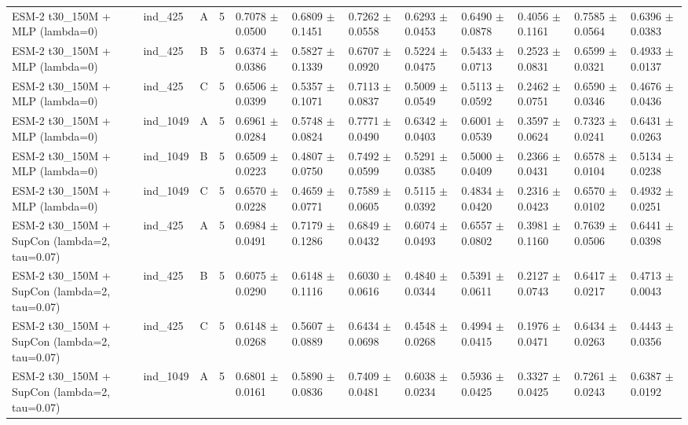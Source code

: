 \begin{table}[ht]
\begin{tabular}{llllllllllll}
ESM-2 t30\_150M + MLP (lambda=0) & ind\_425 & A & 5 & 0.7078 $\pm$ 0.0500 & 0.6809 $\pm$ 0.1451 & 0.7262 $\pm$ 0.0558 & 0.6293 $\pm$ 0.0453 & 0.6490 $\pm$ 0.0878 & 0.4056 $\pm$ 0.1161 & 0.7585 $\pm$ 0.0564 & 0.6396 $\pm$ 0.0383 \\
ESM-2 t30\_150M + MLP (lambda=0) & ind\_425 & B & 5 & 0.6374 $\pm$ 0.0386 & 0.5827 $\pm$ 0.1339 & 0.6707 $\pm$ 0.0920 & 0.5224 $\pm$ 0.0475 & 0.5433 $\pm$ 0.0713 & 0.2523 $\pm$ 0.0831 & 0.6599 $\pm$ 0.0321 & 0.4933 $\pm$ 0.0137 \\
ESM-2 t30\_150M + MLP (lambda=0) & ind\_425 & C & 5 & 0.6506 $\pm$ 0.0399 & 0.5357 $\pm$ 0.1071 & 0.7113 $\pm$ 0.0837 & 0.5009 $\pm$ 0.0549 & 0.5113 $\pm$ 0.0592 & 0.2462 $\pm$ 0.0751 & 0.6590 $\pm$ 0.0346 & 0.4676 $\pm$ 0.0436 \\
ESM-2 t30\_150M + MLP (lambda=0) & ind\_1049 & A & 5 & 0.6961 $\pm$ 0.0284 & 0.5748 $\pm$ 0.0824 & 0.7771 $\pm$ 0.0490 & 0.6342 $\pm$ 0.0403 & 0.6001 $\pm$ 0.0539 & 0.3597 $\pm$ 0.0624 & 0.7323 $\pm$ 0.0241 & 0.6431 $\pm$ 0.0263 \\
ESM-2 t30\_150M + MLP (lambda=0) & ind\_1049 & B & 5 & 0.6509 $\pm$ 0.0223 & 0.4807 $\pm$ 0.0750 & 0.7492 $\pm$ 0.0599 & 0.5291 $\pm$ 0.0385 & 0.5000 $\pm$ 0.0409 & 0.2366 $\pm$ 0.0431 & 0.6578 $\pm$ 0.0104 & 0.5134 $\pm$ 0.0238 \\
ESM-2 t30\_150M + MLP (lambda=0) & ind\_1049 & C & 5 & 0.6570 $\pm$ 0.0228 & 0.4659 $\pm$ 0.0771 & 0.7589 $\pm$ 0.0605 & 0.5115 $\pm$ 0.0392 & 0.4834 $\pm$ 0.0420 & 0.2316 $\pm$ 0.0423 & 0.6570 $\pm$ 0.0102 & 0.4932 $\pm$ 0.0251 \\
ESM-2 t30\_150M + SupCon (lambda=2, tau=0.07) & ind\_425 & A & 5 & 0.6984 $\pm$ 0.0491 & 0.7179 $\pm$ 0.1286 & 0.6849 $\pm$ 0.0432 & 0.6074 $\pm$ 0.0493 & 0.6557 $\pm$ 0.0802 & 0.3981 $\pm$ 0.1160 & 0.7639 $\pm$ 0.0506 & 0.6441 $\pm$ 0.0398 \\
ESM-2 t30\_150M + SupCon (lambda=2, tau=0.07) & ind\_425 & B & 5 & 0.6075 $\pm$ 0.0290 & 0.6148 $\pm$ 0.1116 & 0.6030 $\pm$ 0.0616 & 0.4840 $\pm$ 0.0344 & 0.5391 $\pm$ 0.0611 & 0.2127 $\pm$ 0.0743 & 0.6417 $\pm$ 0.0217 & 0.4713 $\pm$ 0.0043 \\
ESM-2 t30\_150M + SupCon (lambda=2, tau=0.07) & ind\_425 & C & 5 & 0.6148 $\pm$ 0.0268 & 0.5607 $\pm$ 0.0889 & 0.6434 $\pm$ 0.0698 & 0.4548 $\pm$ 0.0268 & 0.4994 $\pm$ 0.0415 & 0.1976 $\pm$ 0.0471 & 0.6434 $\pm$ 0.0263 & 0.4443 $\pm$ 0.0356 \\
ESM-2 t30\_150M + SupCon (lambda=2, tau=0.07) & ind\_1049 & A & 5 & 0.6801 $\pm$ 0.0161 & 0.5890 $\pm$ 0.0836 & 0.7409 $\pm$ 0.0481 & 0.6038 $\pm$ 0.0234 & 0.5936 $\pm$ 0.0425 & 0.3327 $\pm$ 0.0425 & 0.7261 $\pm$ 0.0243 & 0.6387 $\pm$ 0.0192 \\

\end{tabular}
\end{table}
